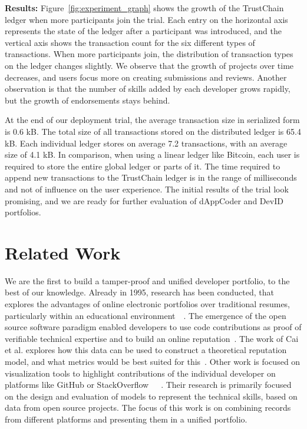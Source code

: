 \textbf{Results:}
Figure~\ref{fig:experiment_graph} shows the growth of the TrustChain ledger when more participants join the trial.
Each entry on the horizontal axis represents the state of the ledger after a participant was introduced, and the vertical axis shows the transaction count for the six different types of transactions.
When more participants join, the distribution of transaction types on the ledger changes slightly.
We observe that the growth of projects over time decreases, and users focus more on creating submissions and reviews.
Another observation is that the number of skills added by each developer grows rapidly, but the growth of endorsements stays behind.

At the end of our deployment trial, the average transaction size in serialized form is 0.6 kB.
The total size of all transactions stored on the distributed ledger is 65.4 kB.
Each individual ledger stores on average 7.2 transactions, with an average size of 4.1 kB.
In comparison, when using a linear ledger like Bitcoin, each user is required to store the entire global ledger or parts of it.  
The time required to append new transactions to the TrustChain ledger is in the range of milliseconds and not of influence on the user experience.
The initial results of the trial look promising, and we are ready for further evaluation of dAppCoder and DevID portfolios. 

\section{Related Work}
We are the first to build a tamper-proof and unified developer portfolio, to the best of our knowledge.
Already in 1995, research has been conducted, that explores the advantages of online electronic portfolios over traditional resumes, particularly within an educational environment~\cite{riggsby1995electronic}~\cite{barrett2000electronic}.
The emergence of the open source software paradigm enabled developers to use code contributions as proof of verifiable technical expertise and to build an online reputation~\cite{riehle2015open}.
The work of Cai et al. explores how this data can be used to construct a theoretical reputation model, and what metrics would be best suited for this~\cite{cai2016reputation}.
Other work is focused on visualization tools to highlight contributions of the individual developer on platforms like GitHub or StackOverflow~\cite{jaruchotrattanasakul2016open}~\cite{saxena2017know}~\cite{chen2016supporting}.
Their research is primarily focused on the design and evaluation of models to represent the technical skills, based on data from open source projects.
The focus of this work is on combining records from different platforms and presenting them in a unified portfolio.

